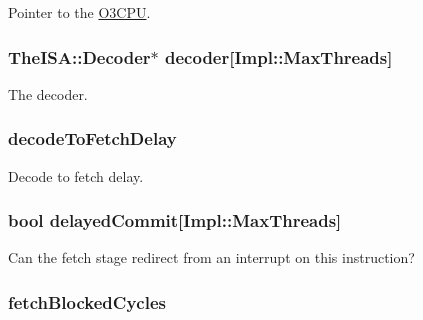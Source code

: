 Pointer to the \hyperlink{namespaceO3CPU}{O3CPU}. \hypertarget{classDefaultFetch_ad59085cbedffbd5bf8cd9eb714041505}{
\subsubsection[{decoder}]{\setlength{\rightskip}{0pt plus 5cm}TheISA::Decoder$\ast$ {\bf decoder}\mbox{[}Impl::MaxThreads\mbox{]}}}
\label{classDefaultFetch_ad59085cbedffbd5bf8cd9eb714041505}
The decoder. \hypertarget{classDefaultFetch_a2ef45e1e2bd510cfb43c0a03a6ab3f1c}{
\subsubsection[{decodeToFetchDelay}]{ {\bf decodeToFetchDelay}}}
\label{classDefaultFetch_a2ef45e1e2bd510cfb43c0a03a6ab3f1c}
Decode to fetch delay. \hypertarget{classDefaultFetch_af247386188fbfaba3ea218eff3a771db}{
\subsubsection[{delayedCommit}]{\setlength{\rightskip}{0pt plus 5cm}bool {\bf delayedCommit}\mbox{[}Impl::MaxThreads\mbox{]}}}
\label{classDefaultFetch_af247386188fbfaba3ea218eff3a771db}
Can the fetch stage redirect from an interrupt on this instruction? \hypertarget{classDefaultFetch_a0501ffad4abed98618a6cf0ba9c3599b}{
\subsubsection[{fetchBlockedCycles}]{ {\bf fetchBlockedCycles}}}
\label{classDefaultFetch_a0501ffad4abed98618a6cf0ba9c3599b}
